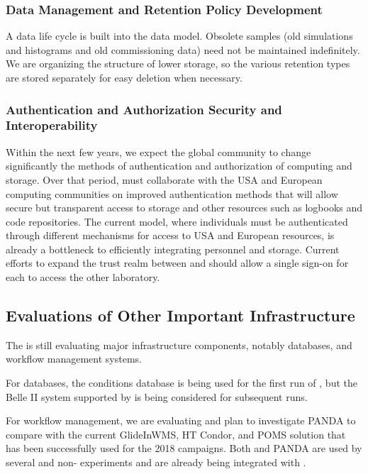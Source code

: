 \subsubsection{Data Management and Retention Policy Development}



A data life cycle is built into the  data model.  Obsolete samples (old simulations and histograms and old commissioning data) need not be maintained indefinitely.  
We are organizing the structure of lower storage, so the various retention types are stored separately for easy deletion when necessary.  

\subsubsection{Authentication and Authorization Security and Interoperability}\label{ch-comp-auth}

Within the next few years, we expect the global  community to change significantly the methods of authentication and authorization of computing and storage. 
Over that period,  must collaborate with the USA and European  computing communities on improved authentication methods  that will allow secure but transparent access to storage and other resources such as logbooks and code repositories.  The current model, where individuals must be authenticated through different mechanisms for access to USA and European resources, is already a bottleneck to efficiently integrating personnel and storage. 
Current efforts to expand the trust realm between  and  should allow a single sign-on for each to access the other laboratory.


\subsection{Evaluations of Other Important Infrastructure}

The   is still evaluating major infrastructure components, notably databases, and workflow management systems.

For databases\cite{Laycock:2019ynk}, the  conditions database is being used for the first run of , but the Belle II\cite{Ritter:2018jxh} system supported by  is being considered for subsequent runs. 

For workflow management, we are evaluating \cite{Falabella:2016waj} and plan to investigate PANDA\cite{Megino:2017ywl} to compare with the current GlideInWMS, HT Condor, and POMS solution that has been successfully used for the 2018  campaigns.
Both  and PANDA are used by several  and non- experiments and are already being integrated with . 
